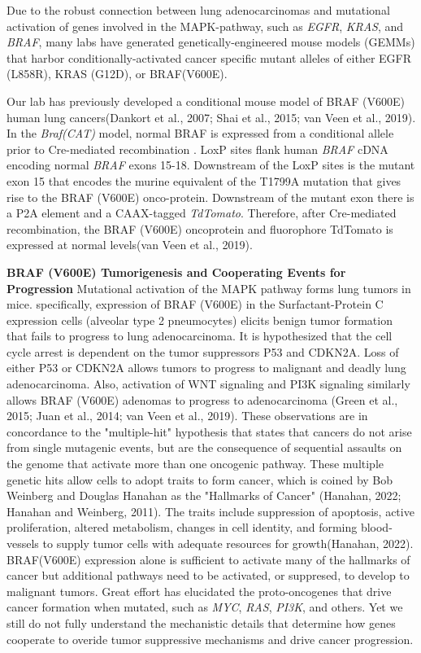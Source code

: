 Due to the robust connection between lung adenocarcinomas and mutational activation of genes involved in the MAPK-pathway, such as \emph{EGFR}, \emph{KRAS}, and \emph{BRAF}, many labs have generated genetically-engineered mouse models (GEMMs) that harbor conditionally-activated cancer specific mutant alleles of either EGFR (L858R), KRAS (G12D), or BRAF(V600E).

Our lab has previously developed a conditional mouse model of BRAF (V600E) human lung cancers(Dankort et al., 2007; Shai et al., 2015; van Veen et al., 2019). In the \emph{Braf(CAT)} model, normal BRAF is expressed from a conditional allele prior to Cre-mediated recombination . LoxP sites flank human \emph{BRAF} cDNA encoding normal \emph{BRAF} exons 15-18. Downstream of the LoxP sites is the mutant exon 15 that encodes the murine equivalent of the T1799A mutation that gives rise to the BRAF (V600E) onco-protein. Downstream of the mutant exon there is a P2A element and a CAAX-tagged \emph{TdTomato}. Therefore, after Cre-mediated recombination, the BRAF (V600E) oncoprotein and fluorophore TdTomato is expressed at normal levels(van Veen et al., 2019).

\textbf{BRAF (V600E) Tumorigenesis and Cooperating Events for Progression} Mutational activation of the MAPK pathway forms lung tumors in mice. specifically, expression of BRAF (V600E) in the Surfactant-Protein C expression cells (alveolar type 2 pneumocytes) elicits benign tumor formation that fails to progress to lung adenocarcinoma. It is hypothesized that the cell cycle arrest is dependent on the tumor suppressors P53 and CDKN2A. Loss of either P53 or CDKN2A allows tumors to progress to malignant and deadly lung adenocarcinoma. Also, activation of WNT signaling and PI3K signaling similarly allows BRAF (V600E) adenomas to progress to adenocarcinoma (Green et al., 2015; Juan et al., 2014; van Veen et al., 2019). These observations are in concordance to the "multiple-hit" hypothesis that states that cancers do not arise from single mutagenic events, but are the consequence of sequential assaults on the genome that activate more than one oncogenic pathway. These multiple genetic hits allow cells to adopt traits to form cancer, which is coined by Bob Weinberg and Douglas Hanahan as the "Hallmarks of Cancer" (Hanahan, 2022; Hanahan and Weinberg, 2011). The traits include suppression of apoptosis, active proliferation, altered metabolism, changes in cell identity, and forming blood-vessels to supply tumor cells with adequate resources for growth(Hanahan, 2022). BRAF(V600E) expression alone is sufficient to activate many of the hallmarks of cancer but additional pathways need to be activated, or suppresed, to develop to malignant tumors. Great effort has elucidated the proto-oncogenes that drive cancer formation when mutated, such as \emph{MYC}, \emph{RAS}, \emph{PI3K}, and others. Yet we still do not fully understand the mechanistic details that determine how genes cooperate to overide tumor suppressive mechanisms and drive cancer progression.

